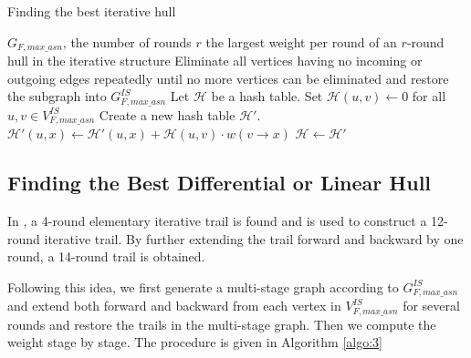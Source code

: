 \begin{algorithm}
	\caption{Finding the best iterative hull}
	\label{algo:2}
	\begin{algorithmic}[1]
		\Require $G_{F,max\_asn}$, the number of rounds $r$
		\Ensure the largest weight per round of an $r$-round hull in the iterative structure
		\Procedure {}{}
		\State Eliminate all vertices having no incoming or outgoing edges repeatedly until no more vertices can be eliminated and restore the subgraph into $G^{IS}_{F,max\_asn}$
		\State Let $\mathcal{H}$ be a hash table. Set $\mathcal{H}(u,v)\leftarrow 0$ for all $u,v\in V^{IS}_{F,max\_asn}$
		\State Create a new hash table $\mathcal{H}'$. 
		\State $\mathcal{H}'(u,x)\leftarrow \mathcal{H}'(u,x)+\mathcal{H}(u,v)\cdot w(v\rightarrow x)$
		\EndFor
		\EndFor
		\State $\mathcal{H}\leftarrow \mathcal{H}'$
		\EndFor
		\State {}
		\EndProcedure
	\end{algorithmic}
\end{algorithm}

\subsection{Finding the Best Differential or Linear Hull}\label{sec:fbh}

In \cite{W08}, a 4-round elementary iterative trail is found and is used to construct a 12-round iterative trail. By further extending the trail forward and backward by one round, a 14-round trail is obtained. 

Following this idea, we first generate a multi-stage graph according to $G^{IS}_{F,max\_asn}$ and extend both forward and backward from each vertex in $V^{IS}_{F,max\_asn}$ for several rounds and restore the trails in the multi-stage graph. Then we compute the weight stage by stage. The procedure is given in Algorithm \ref{algo:3}

